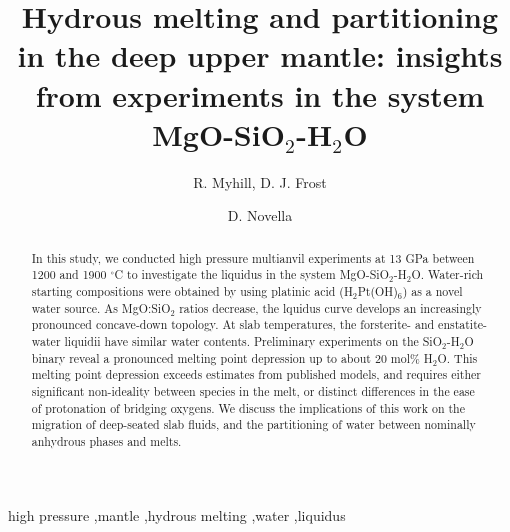 \documentclass[review]{elsarticle}
\begin{document}
\begin{frontmatter}

\title{Hydrous melting and partitioning in the deep upper mantle: insights from experiments in the system MgO-SiO$_2$-H$_2$O}

\author{R. Myhill, D. J. Frost}
\address{Bayerisches Geoinstitut, Universit\"{a}t Bayreuth, Universit\"{a}tsstrasse 30, 95447 Bayreuth, Germany}

\author{D. Novella}
\address{Laboratoire Magmas et Volcans, Universit\'{e} Blaise Pascal, 5 Rue Kessler, 63038 Clermond-Ferrand, France}




\begin{abstract}

In this study, we conducted high pressure multianvil experiments at 13 GPa between 1200 and 1900 $^{\circ}$C to investigate the liquidus in the system MgO-SiO$_2$-H$_2$O. Water-rich starting compositions were obtained by using platinic acid (H$_2$Pt(OH)$_6$) as a novel water source. As MgO:SiO$_2$ ratios decrease, the lquidus curve develops an increasingly pronounced concave-down topology. At slab temperatures, the forsterite- and enstatite-water liquidii have similar water contents. Preliminary experiments on the SiO$_2$-H$_2$O binary reveal a pronounced melting point depression up to about 20 mol\% H$_2$O. This melting point depression exceeds estimates from published models, and requires either significant non-ideality between species in the melt, or distinct differences in the ease of protonation of bridging oxygens. We discuss the implications of this work on the migration of deep-seated slab fluids, and the partitioning of water between nominally anhydrous phases and melts.
\end{abstract}

\begin{keyword}
high pressure \sep mantle \sep hydrous melting \sep water \sep liquidus
\end{keyword}

\end{frontmatter}
\end{document}
